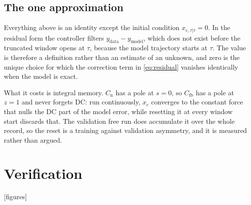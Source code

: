 \documentclass[11pt]{article}
\newcommand{\Cfb}{C_{\mathrm{fb}}}
\newcommand{\Cnorm}{C_{\mathrm{n}}}
\newcommand{\ydata}{y_{\mathrm{data}}}
\newcommand{\ymodel}{y_{\mathrm{model}}}
\begin{document}
\subsection{The one approximation}

Everything above is an identity except the initial condition $x_{c,\tau|\tau} = 0$. In the
residual form the controller filters $\ydata - \ymodel$, which does not exist before the
truncated window opens at $\tau$, because the model trajectory starts at $\tau$. The value is
therefore a definition rather than an estimate of an unknown, and zero is the unique choice for
which the correction term in \eqref{eq:residual} vanishes identically when the model is exact.

What it costs is integral memory. $\Cnorm$ has a pole at $s = 0$, so $\Cfb$ has a pole at $z = 1$
and never forgets DC: run continuously, $x_c$ converges to the constant force that nulls the DC
part of the model error, while resetting it at every window start discards that. The validation
free run does accumulate it over the whole record, so the reset is a training against validation
asymmetry, and it is measured rather than argued.

\section{Verification}

[figures]
\end{document}
